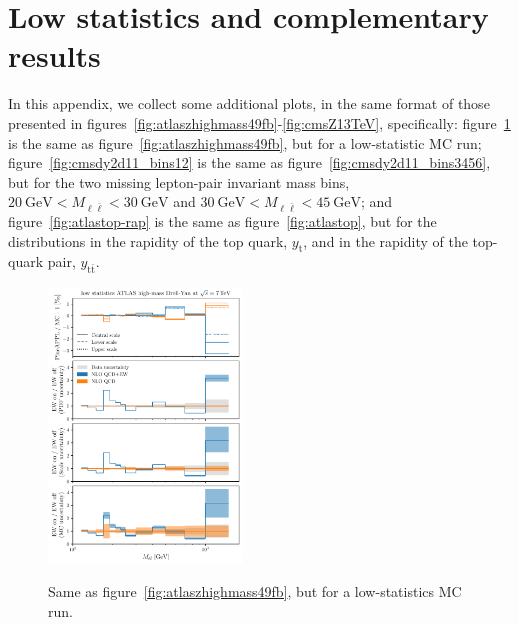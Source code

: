 \section{Low statistics and complementary results}
\label{app:add_plots}

In this appendix, we collect some additional plots, in the same format of those
presented in figures~\ref{fig:atlaszhighmass49fb}-\ref{fig:cmsZ13TeV},
specifically: figure~\ref{fig:atlaszhighmass49fb-lowstat} is the same as
figure~\ref{fig:atlaszhighmass49fb}, but for a low-statistic MC run;
figure~\ref{fig:cmsdy2d11_bins12} is the same as
figure~\ref{fig:cmsdy2d11_bins3456}, but for the two missing lepton-pair
invariant mass bins,
$\SI{20}{\giga\electronvolt}<M_{\ell\bar\ell}<\SI{30}{\giga\electronvolt}$ and
$\SI{30}{\giga\electronvolt}<M_{\ell\bar\ell}<\SI{45}{\giga\electronvolt}$;
and figure~\ref{fig:atlastop-rap} is the same as figure~\ref{fig:atlastop},
but for the distributions in the rapidity of the top quark, $y_{\mathrm{t}}$,
and in the rapidity of the top-quark pair, $y_{\mathrm{t}\bar{\mathrm{t}}}$.

\begin{figure}[!t]
    \centering
    \includegraphics[width=0.46\textwidth]{figures/pineappl_ATLASZHIGHMASS49FB_lowstat}\\
    \caption{Same as figure~\ref{fig:atlaszhighmass49fb}, but for a
    low-statistics MC run.}
    \label{fig:atlaszhighmass49fb-lowstat}
\end{figure}

